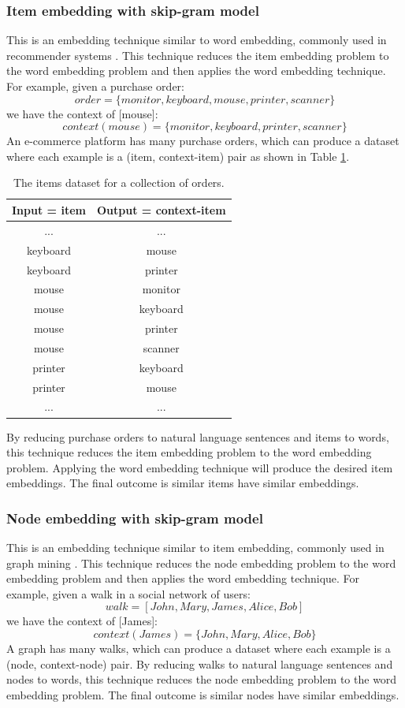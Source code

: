 \documentclass[conference]{IEEEtran}
\begin{document}
\subsubsection{Item embedding with skip-gram model}
This is an embedding technique similar to word embedding, commonly used in recommender systems \cite{barkan2016item2vec}.
This technique reduces the item embedding problem to the word embedding problem and then applies the word embedding technique.
For example, given a purchase order:
\[ order = \{monitor, keyboard, mouse, printer, scanner\} \]
we have the context of [mouse]:
\[ context(mouse) = \{monitor, keyboard, printer, scanner\} \]
An e-commerce platform has many purchase orders, which can produce a dataset where each example is a (item, context-item) pair as shown in Table \ref{tab:items}.
\begin{table}[!ht]
	\centering
	\caption{The items dataset for a collection of orders.}
	\begin{tabular}{cc} \hline \rowcolor{blue!30}
		Input = item & Output = context-item \\ \hline
		... & ...       \\ \hline
		keyboard & mouse \\ \hline
		keyboard & printer \\ \hline
		mouse & monitor \\ \hline
		mouse & keyboard \\ \hline
		mouse & printer \\ \hline
		mouse & scanner \\ \hline
		printer & keyboard \\ \hline
		printer & mouse \\ \hline
		... & ...       \\ \hline
	\end{tabular}
	\label{tab:items}
\end{table}
By reducing purchase orders to natural language sentences and items to words,
this technique reduces the item embedding problem to the word embedding problem.
Applying the word embedding technique will produce the desired item embeddings.
The final outcome is similar items have similar embeddings.

\subsubsection{Node embedding with skip-gram model}
This is an embedding technique similar to item embedding, commonly used in
graph mining \cite{perozzi2014deepwalk} \cite{grover2016node2vec}.
This technique reduces the node embedding problem to the word embedding problem and then applies the word embedding technique.
For example, given a walk in a social network of users:
\[ walk = [John, Mary, James, Alice, Bob] \]
we have the context of [James]:
\[ context(James) = \{John, Mary, Alice, Bob\} \]
A graph has many walks, which can produce a dataset where each example is a (node, context-node) pair.
By reducing walks to natural language sentences and nodes to words,
this technique reduces the node embedding problem to the word embedding problem.
The final outcome is similar nodes have similar embeddings.
\end{document}
